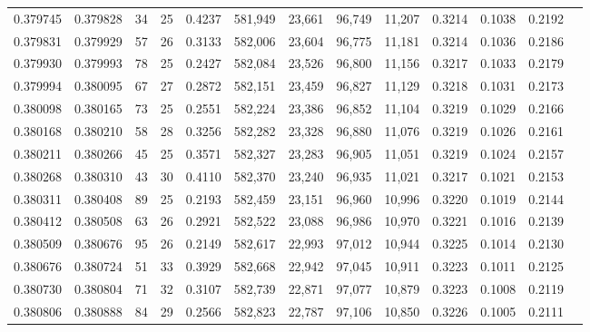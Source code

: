 \begin{tabular}{rrrrrrrrrrrrr}
0.379745 & 0.379828 &    34 &  25 &                                     0.4237 & 581,949 &  23,661 &  96,749 &  11,207 & 0.3214 & 0.1038 & 0.2192 \\
0.379831 & 0.379929 &    57 &  26 &                                     0.3133 & 582,006 &  23,604 &  96,775 &  11,181 & 0.3214 & 0.1036 & 0.2186 \\
0.379930 & 0.379993 &    78 &  25 &                                     0.2427 & 582,084 &  23,526 &  96,800 &  11,156 & 0.3217 & 0.1033 & 0.2179 \\
0.379994 & 0.380095 &    67 &  27 &                                     0.2872 & 582,151 &  23,459 &  96,827 &  11,129 & 0.3218 & 0.1031 & 0.2173 \\
0.380098 & 0.380165 &    73 &  25 &                                     0.2551 & 582,224 &  23,386 &  96,852 &  11,104 & 0.3219 & 0.1029 & 0.2166 \\
0.380168 & 0.380210 &    58 &  28 &                                     0.3256 & 582,282 &  23,328 &  96,880 &  11,076 & 0.3219 & 0.1026 & 0.2161 \\
0.380211 & 0.380266 &    45 &  25 &                                     0.3571 & 582,327 &  23,283 &  96,905 &  11,051 & 0.3219 & 0.1024 & 0.2157 \\
0.380268 & 0.380310 &    43 &  30 &                                     0.4110 & 582,370 &  23,240 &  96,935 &  11,021 & 0.3217 & 0.1021 & 0.2153 \\
0.380311 & 0.380408 &    89 &  25 &                                     0.2193 & 582,459 &  23,151 &  96,960 &  10,996 & 0.3220 & 0.1019 & 0.2144 \\
0.380412 & 0.380508 &    63 &  26 &                                     0.2921 & 582,522 &  23,088 &  96,986 &  10,970 & 0.3221 & 0.1016 & 0.2139 \\
0.380509 & 0.380676 &    95 &  26 &                                     0.2149 & 582,617 &  22,993 &  97,012 &  10,944 & 0.3225 & 0.1014 & 0.2130 \\
0.380676 & 0.380724 &    51 &  33 &                                     0.3929 & 582,668 &  22,942 &  97,045 &  10,911 & 0.3223 & 0.1011 & 0.2125 \\
0.380730 & 0.380804 &    71 &  32 &                                     0.3107 & 582,739 &  22,871 &  97,077 &  10,879 & 0.3223 & 0.1008 & 0.2119 \\
0.380806 & 0.380888 &    84 &  29 &                                     0.2566 & 582,823 &  22,787 &  97,106 &  10,850 & 0.3226 & 0.1005 & 0.2111 \\

\end{tabular}
